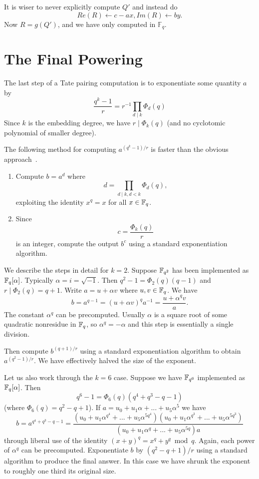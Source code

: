 It is wiser to never explicitly compute $Q'$ and instead do
\[ Re(R) \gets c - a x , Im(R) \gets b y .\]
Now $R = g(Q')$, and we have only computed in $\mathbb{F}_q$.

\section {The Final Powering}

The last step of a Tate pairing computation is
to exponentiate some quantity $a$ by
\[ \frac{q^k-1}{r} = r^{-1} \prod_{d\mid k} \Phi_d(q) \]
Since $k$ is the embedding degree, we have $r \mid \Phi_k(q)$ (and no
cyclotomic polynomial of smaller degree).

The following method for computing $a^{(q^k-1)/r}$ is faster
than the obvious approach~\cite{bakls}.
\begin{enumerate}
\item
Compute $b = a^d $ where
\[ d = \prod_{d\mid k, d<k} \Phi_d(q) , \]
exploiting the identity $x^q = x$ for all $x \in \mathbb{F}_q$.
\item
Since
\[ c = \frac{\Phi_k(q)}{r} \]
is an integer, compute the output $b^c$
using a standard exponentiation algorithm.
\end{enumerate}

We describe the steps in detail
for $k = 2$. Suppose $\mathbb{F}_{q^2}$ has been implemented
as $\mathbb{F}_q[\alpha]$. Typically $\alpha = i = \sqrt{-1}$.
Then $q^2 - 1 = \Phi_2(q)(q-1)$ and
$r \mid \Phi_2(q) = q + 1$. Write $a = u + \alpha v$ where $u,v \in \mathbb{F}_q$.
We have
\[ b = a^{q-1} = (u + \alpha v)^q a^{-1} = \frac{u + \alpha^q v}{a} .\]
The constant $\alpha^q$ can be precomputed. Usually $\alpha$ is a square root
of some quadratic nonresidue in $\mathbb{F}_q$, so $\alpha^q = -\alpha$ and
this step is essentially a single division.

Then compute $b^{(q+1)/r}$ using a standard exponentiation algorithm
to obtain $a^{(q^2-1)/r}$. We have effectively halved the size of the exponent.

Let us also work through the $k = 6$ case. Suppose we have $\mathbb{F}_{q^6}$
implemented as $\mathbb{F}_q[\alpha]$. Then
\[ q^6 - 1 = \Phi_6(q) (q^4 + q^3 - q - 1)\]
(where $\Phi_6(q) = q^2 - q + 1$).
If $a = u_0 + u_1 \alpha + ... + u_5 \alpha^5$ we have
\[ b =
a^{q^4 + q^3 - q - 1}
= \frac{
(u_0 + u_1 \alpha^{q^4} + ... + u_5 \alpha^{5q^4})
(u_0 + u_1 \alpha^{q^3} + ... + u_5 \alpha^{5q^3})}
{
(u_0 + u_1 \alpha^q + ... + u_5 \alpha^{5q})a
}
\]
through liberal use of the identity $(x + y)^q = x^q + y^q \bmod q$.
Again, each power of $\alpha^q$ can be precomputed.
Exponentiate $b$
by $(q^2 - q + 1)/r$ using a standard algorithm to produce the final answer.
In this case we have shrunk the exponent to roughly one third its original
size.

